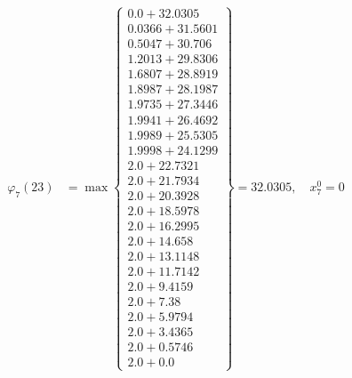 \documentclass{article}
\begin{document}
\begin{align*}
  
  
  
\varphi_{7}(23) &= \max \left\{ \begin{array}{c}
0.0 + 32.0305 \\
 0.0366 + 31.5601 \\
 0.5047 + 30.706 \\
 1.2013 + 29.8306 \\
 1.6807 + 28.8919 \\
 1.8987 + 28.1987 \\
 1.9735 + 27.3446 \\
 1.9941 + 26.4692 \\
 1.9989 + 25.5305 \\
 1.9998 + 24.1299 \\
 2.0 + 22.7321 \\
 2.0 + 21.7934 \\
 2.0 + 20.3928 \\
 2.0 + 18.5978 \\
 2.0 + 16.2995 \\
 2.0 + 14.658 \\
 2.0 + 13.1148 \\
 2.0 + 11.7142 \\
 2.0 + 9.4159 \\
 2.0 + 7.38 \\
 2.0 + 5.9794 \\
 2.0 + 3.4365 \\
 2.0 + 0.5746 \\
 2.0 + 0.0
\end{array} \right\}=32.0305,\quad x_{7}^0=0\\
  
  
  

\end{align*}
\end{document}
